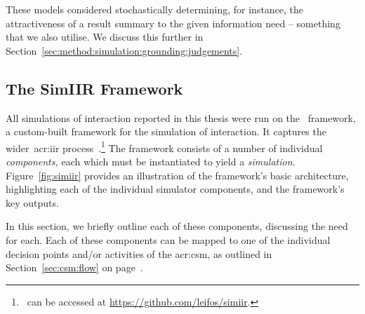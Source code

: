 
These models considered stochastically determining, for instance, the attractiveness of a result summary to the given information need -- something that we also utilise. We discuss this further in Section~\ref{sec:method:simulation:grounding:judgements}.

\subsection{The SimIIR Framework}\label{sec:method:simulation:simiir}
All simulations of interaction reported in this thesis were run on the \simiir~framework, a custom-built framework for the simulation of interaction. It captures the wider~\gls{acr:iir} process~\citep{maxwell2016simiir}.\footnote{\simiir~can be accessed at \url{https://github.com/leifos/simiir}. } The framework consists of a number of individual \emph{components,} each which must be instantiated to yield a \emph{simulation.} Figure~\ref{fig:simiir} provides an illustration of the framework's basic architecture, highlighting each of the individual simulator components, and the framework's key outputs.

In this section, we briefly outline each of these components, discussing the need for each. Each of these components can be mapped to one of the individual decision points and/or activities of the \gls{acr:csm}, as outlined in Section~\ref{sec:csm:flow} on page~\pageref{sec:csm:flow}.

